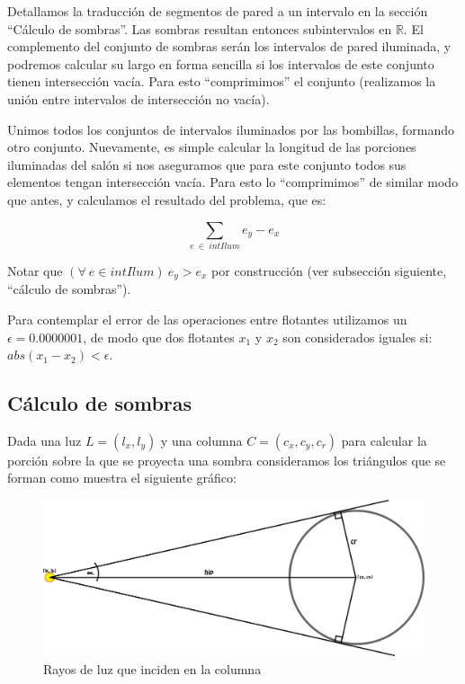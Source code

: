 Detallamos la traducción de segmentos de pared a un intervalo en la sección
``Cálculo de sombras''. Las sombras resultan entonces subintervalos en $\mathbb R$.
El complemento del conjunto de sombras serán los intervalos de pared iluminada,
y podremos calcular su largo en forma sencilla si los intervalos de este conjunto tienen
intersección vacía. Para esto ``comprimimos'' el conjunto (realizamos la unión
entre intervalos de intersección no vacía).

Unimos todos los conjuntos de intervalos iluminados por las bombillas, formando otro conjunto.
Nuevamente, es simple calcular la longitud de las porciones iluminadas del salón si nos aseguramos que
para este conjunto todos sus elementos tengan intersección vacía. Para esto lo ``comprimimos''
de similar modo que antes, y calculamos el resultado del problema, que es:

\begin{center}
$$\sum_{e\ \in\ intIlum}e_y - e_x$$
\end{center}

Notar que $(\forall\ e \in intIlum)\ e_y > e_x$ por construcción (ver
subsección siguiente, ``cálculo de sombras'').

Para contemplar el error de las operaciones entre flotantes utilizamos un $\epsilon = 0.0000001$, 
de modo que dos flotantes $x_1$ y $x_2$ son considerados iguales si: $abs(x_1 - x_2) < \epsilon$.

\subsection*{Cálculo de sombras}
Dada una luz $L = (l_x, l_y)$ y una columna $C = (c_x, c_y, c_r)$ para calcular la porción sobre
la que se proyecta una sombra consideramos los triángulos que se forman como muestra el siguiente
gráfico:

\begin{figure}[H]
\centering
\label{bl_3}
\caption{\sc Rayos de luz que inciden en la columna}
\includegraphics[scale=1.0]{./figuras/bl_3.png}
\end{figure} 

